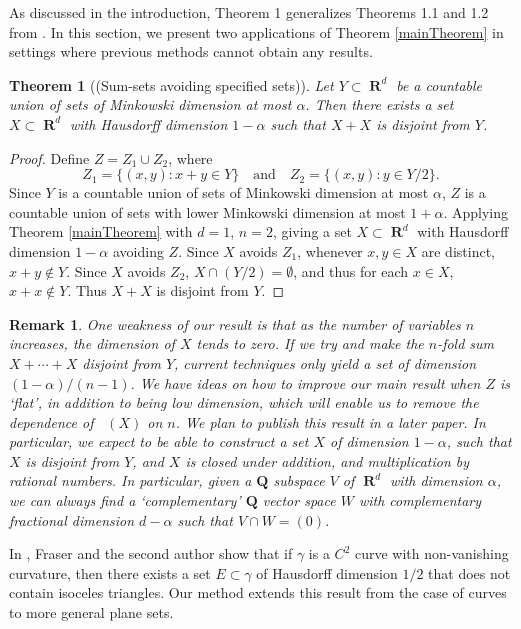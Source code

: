 \documentclass[dvipsnames,letterpaper,12pt]{article}
\theoremstyle{plain}
\newtheorem{theorem}{Theorem}
\newtheorem*{remark}{Remark}
\DeclareMathOperator{\hausdim}{\dim_{\mathbf{H}}}
\DeclareMathOperator{\RR}{\mathbf{R}}
\begin{document}
As discussed in the introduction, Theorem 1 generalizes Theorems 1.1 and 1.2 from \cite{MalabikaRob}. In this section, we present two applications of Theorem \ref{mainTheorem} in settings where previous methods cannot obtain any results.

\begin{theorem}[(Sum-sets avoiding specified sets)]
	Let $Y \subset \RR^d$ be a countable union of sets of Minkowski dimension at most $\alpha$. Then there exists a set $X \subset \RR^d$ with Hausdorff dimension $1 - \alpha$ such that $X + X$ is disjoint from $Y$.
\end{theorem}
\begin{proof}
	Define $Z = Z_1 \cup Z_2$, where
	\[ Z_1 = \{ (x,y) : x + y \in Y \} \quad \text{and} \quad Z_2 = \{ (x,y): y \in Y/2 \}. \]
	Since $Y$ is a countable union of sets of Minkowski dimension at most $\alpha$, $Z$ is a countable union of sets with lower Minkowski dimension at most $1 + \alpha$. Applying Theorem \ref{mainTheorem} with $d = 1$, $n = 2$, giving a set $X \subset \RR^d$ with Hausdorff dimension $1 - \alpha$ avoiding $Z$. Since $X$ avoids $Z_1$, whenever $x,y \in X$ are distinct, $x + y \not \in Y$. Since $X$ avoids $Z_2$, $X \cap (Y/2) = \emptyset$, and thus for each $x \in X$, $x + x \not \in Y$. Thus $X + X$ is disjoint from $Y$.
\end{proof}

\begin{remark}
	One weakness of our result is that as the number of variables $n$ increases, the dimension of $X$ tends to zero. If we try and make the $n$-fold sum $X + \cdots + X$ disjoint from $Y$, current techniques only yield a set of dimension $(1 - \alpha)/(n-1)$. We have ideas on how to improve our main result when $Z$ is `flat', in addition to being low dimension, which will enable us to remove the dependence of $\hausdim(X)$ on $n$. We plan to publish this result in a later paper. In particular, we expect to be able to construct a set $X$ of dimension $1 - \alpha$, such that $X$ is disjoint from $Y$, and $X$ is closed under addition, and multiplication by rational numbers. In particular, given a $\mathbf{Q}$ subspace $V$ of $\RR^d$ with dimension $\alpha$, we can always find a `complementary' $\mathbf{Q}$ vector space $W$ with complementary fractional dimension $d - \alpha$ such that $V \cap W = (0)$.
\end{remark}

In \cite{MalabikaRob}, Fraser and the second author show that if $\gamma$ is a $C^2$ curve with non-vanishing curvature, then there exists a set $E \subset \gamma$ of Hausdorff dimension $1/2$ that does not contain isoceles triangles. Our method extends this result from the case of curves to more general plane sets.
\end{document}

